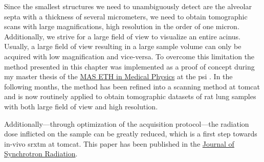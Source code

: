 Since the smallest structures we need to unambiguously detect are the alveolar septa with a thickness of several micrometers, we need to obtain tomographic scans with large magnifications, \ie high resolution in the order of one micron. Additionally, we strive for a large field of view to visualize an entire acinus. Usually, a large field of view resulting in a large sample volume can only be acquired with low magnification and vice-versa. To overcome this limitation the method presented in this chapter was implemented as a proof of concept during my master thesis of the \href{http://www.biomed.ee.ethz.ch/nds/}{MAS ETH in Medical Physics} at the \ac{psi} \cite{Haberthuer2008c}. In the following months, the method has been refined into a scanning method at \ac{tomcat} and is now routinely applied to obtain tomographic datasets of rat lung samples with both large field of view and high resolution.

Additionally---through optimization of the acquisition protocol---the radiation dose inflicted on the sample can be greatly reduced, which is a first step towards in-vivo \ac{srxtm} at \ac{tomcat}. This paper has been published in the \href{http://journals.iucr.org/s/}{Journal of Synchrotron Radiation}.